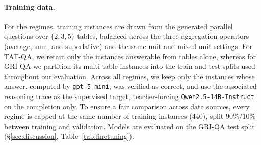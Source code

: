 \paragraph{Training data.} For the \name{} regimes, training instances are
drawn from the generated parallel questions over $\{2,3,5\}$ tables,
balanced across the three aggregation operators (average, sum, and
superlative) and the same-unit and mixed-unit settings. For TAT-QA, we
retain only the instances answerable from tables alone, whereas for GRI-QA
we partition its multi-table instances into the train and test splits used
throughout our evaluation. Across all regimes, we keep only the instances
whose answer, computed by \texttt{gpt-5-mini}, was verified as correct, and
use the associated reasoning trace as the supervised target, teacher-forcing
\texttt{Qwen2.5-14B-Instruct} on the completion only. To ensure a fair
comparison across data sources, every regime is capped at the same number
of training instances ($440$), split $90\%/10\%$ between training and
validation. Models are evaluated on the GRI-QA test split
(\S\ref{sec:discussion}, Table~\ref{tab:finetuning}).

